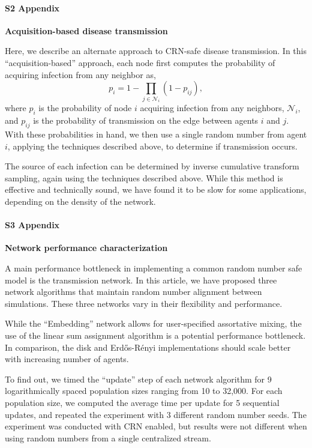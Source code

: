 \documentclass[10pt,letterpaper]{article}
\newcommand{\er}{Erd{\H o}s-R{\'e}nyi }
\begin{document}
\paragraph*{S2 Appendix}\label{a:acquisition}
{\bf Acquisition-based disease transmission}

Here, we describe an alternate approach to CRN-safe disease transmission. In this ``acquisition-based'' approach, each node first computes the probability of acquiring infection from any neighbor as,
\begin{equation}
    p_i = 1 - \prod_{j\in\mathcal{N}_i} (1-p_{ij}),
\end{equation}
where $p_{i}$ is the probability of node $i$ acquiring infection from any neighbors, $\mathcal{N}_i$, and $p_{ij}$ is the probability of transmission on the edge between agents $i$ and $j$. With these probabilities in hand, we then use a single random number from agent $i$, applying the techniques described above, to determine if transmission occurs.

The source of each infection can be determined by inverse cumulative transform sampling, again using the techniques described above. While this method is effective and technically sound, we have found it to be slow for some applications, depending on the density of the network. 


\paragraph*{S3 Appendix}\label{a:perf}
{\bf Network performance characterization}

A main performance bottleneck in implementing a common random number safe model is the transmission network. In this article, we have proposed three network algorithms that maintain random number alignment between simulations. These three networks vary in their flexibility and performance.

While the ``Embedding'' network allows for user-specified assortative mixing, the use of the linear sum assignment algorithm is a potential performance bottleneck. In comparison, the disk and \er implementations should scale better with increasing number of agents.

To find out, we timed the ``update'' step of each network algorithm for 9 logarithmically spaced population sizes ranging from 10 to 32,000. For each population size, we computed the average time per update for 5 sequential updates, and repeated the experiment with 3 different random number seeds. The experiment was conducted with CRN enabled, but results were not different when using random numbers from a single centralized stream.
\end{document}

